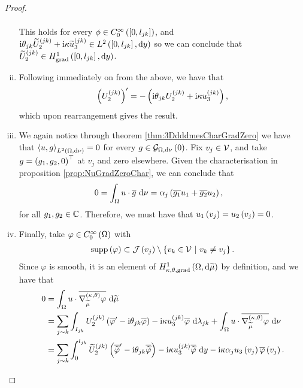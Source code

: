 \begin{proof}
\begin{enumerate}[(i)]
\begin{align*}
		\end{align*}
		This holds for every $\phi\in C^{\infty}_{0}\left( \left[ 0,l_{jk} \right] \right)$, and $\mathrm{i}\theta_{jk}\widetilde{U}_2^{(jk)} + \mathrm{i}\kappa\widetilde{u}_3^{(jk)}\in L^{2}\left( \left[ 0,l_{jk} \right],\mathrm{d} y \right)$ so we can conclude that $\widetilde{U}_2^{(jk)}\in H^1_\mathrm{grad}\left( \left[ 0,l_{jk} \right], \mathrm{d}y \right)$.
		\item Following immediately on from the above, we have that
		\begin{align*}
			\left( U_2^{(jk)} \right)' = - \left(  \mathrm{i}\theta_{jk}U_2^{(jk)} + \mathrm{i}\kappa u_3^{(jk)}  \right),
		\end{align*}
		which upon rearrangement gives the result.
		\item We again notice through theorem \ref{thm:3DdddmesCharGradZero} we have that $\left\langle u , g \right\rangle_{L^{2}\left( \Omega,\mathrm{d} \nu \right)}=0$ for every $g\in\mathcal{G}_{ \Omega, \mathrm{d}\nu}\left( 0 \right)$.
		Fix $v_j\in\mathcal{V}$, and take $g=\left( g_1,g_2,0 \right)^\top$ at $v_j$ and zero elsewhere.
		Given the characterisation in proposition \ref{prop:NuGradZeroChar}, we can conclude that
		\begin{align*}
			0 &= \int_{\Omega} u\cdot\overline{g}  \ \mathrm{d}\nu
			= \alpha_j\left( \overline{g_1}u_1 + \overline{g_2}u_2 \right),
		\end{align*}
		for all $g_1,g_2\in\mathbb{C}$.
		Therefore, we must have that $u_1\left( v_j \right)=u_2\left( v_j \right)=0$.
		\item Finally, take $\varphi\in C^{\infty}_{0}\left( \Omega \right)$ with
		\begin{align*}
			\mathrm{supp}\left( \varphi \right) \subset \mathcal{J}\left( v_j \right)\setminus\left\{ v_k\in\mathcal{V} \ \middle\vert \  v_k\neq v_j \right\}.
		\end{align*}
		Since $\varphi$ is smooth, it is an element of $H^1_{\kappa,\theta,\mathrm{grad}}\left( \Omega, \mathrm{d}\widetilde{\mu} \right)$ by definition, and we have that
		\begin{align*}
		0 &= \int_{\Omega} u\cdot\overline{\nabla^{\left( \kappa, \theta \right)}_{\widetilde{\mu}}\varphi}  \ \mathrm{d}\widetilde{\mu} \\
		&= \sum_{j\sim k}\int_{I_{jk}} U_2^{(jk)}\left( \overline{\varphi}' - \mathrm{i}\theta_{jk}\overline{\varphi} \right) - \mathrm{i}\kappa u_3^{(jk)}\overline{\varphi}  \ \mathrm{d}\lambda_{jk} 
		+ \int_{\Omega} u\cdot\overline{\nabla^{\left( \kappa, \theta \right)}_{\widetilde{\mu}}\varphi}  \ \mathrm{d}\nu \\
		&= \sum_{j\sim k}\int_0^{l_{jk}} \widetilde{U}_2^{(jk)}\left( \overline{\widetilde{\varphi}}' - \mathrm{i}\theta_{jk}\overline{\widetilde{\varphi}} \right) - \mathrm{i}\kappa u_3^{(jk)}\overline{\widetilde{\varphi}} \ \mathrm{d} y
		-\mathrm{i}\kappa\alpha_j u_3\left( v_j \right)\overline{\varphi}\left( v_j \right).
		\end{align*}

\end{enumerate}
\end{proof}
